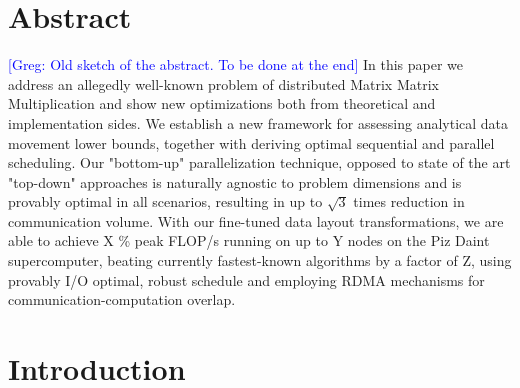 \documentclass[sigplan,review,anonymous]{acmart}\settopmatter{printfolios=true,printccs=false,printacmref=false}
\newcommand\greg[1]{\textcolor{blue}{[Greg: #1]}}
\begin{document}
\section{Abstract}
%
\greg{Old sketch of the abstract. To be done at the end}
%
In this paper we address an allegedly well-known problem of distributed Matrix
Matrix Multiplication and show new optimizations both from theoretical and
implementation sides. We establish a new framework for assessing analytical
data movement lower bounds, together with deriving optimal sequential and
parallel scheduling. Our "bottom-up" parallelization technique, opposed to
state of the art "top-down" approaches is naturally agnostic to problem
dimensions and is provably optimal in all scenarios, resulting in up to
$\sqrt{3}$ times reduction in communication volume. With our fine-tuned data
layout transformations, we are able to achieve X \% peak FLOP/s running on up
to Y nodes on the Piz Daint supercomputer, beating currently fastest-known
algorithms by a factor of Z, using provably I/O optimal, robust schedule and
employing RDMA mechanisms for communication-computation overlap.
%
%



\section{Introduction}
\label{sec:intro}

\end{document}

